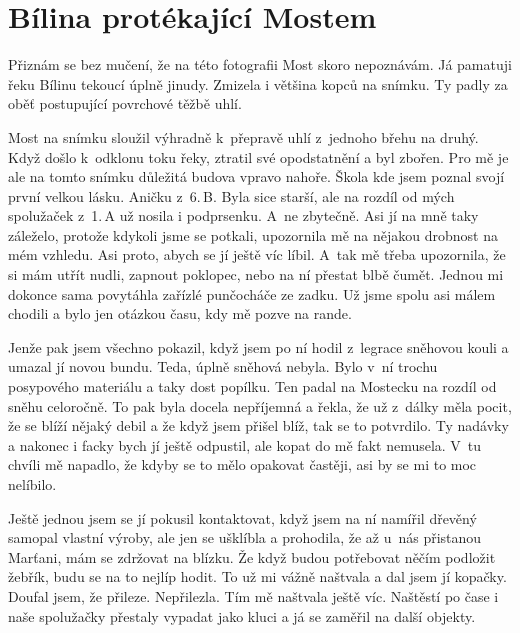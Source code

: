 
\chapter{Bílina protékající Mostem}

Přiznám se bez mučení, že na této fotografii Most skoro nepoznávám. Já pamatuji
řeku Bílinu tekoucí úplně jinudy. Zmizela i většina kopců na snímku. Ty padly
za oběť postupující povrchové těžbě uhlí.

Most na snímku sloužil výhradně k~přepravě uhlí z~jednoho břehu na druhý. Když
došlo k~odklonu toku řeky, ztratil své opodstatnění a byl zbořen. Pro mě je ale
na tomto snímku důležitá budova vpravo nahoře. Škola kde jsem poznal svojí
první velkou lásku. Aničku z~6.\,B. Byla sice starší, ale na rozdíl od mých
spolužaček z~1.\,A už nosila i podprsenku. A~ne zbytečně. Asi jí na mně taky
záleželo, protože kdykoli jsme se potkali, upozornila mě na nějakou drobnost na
mém vzhledu. Asi proto, abych se jí ještě víc líbil. A~tak mě třeba upozornila,
že si mám utřít nudli, zapnout poklopec, nebo na ní přestat blbě čumět. Jednou
mi dokonce sama povytáhla zařízlé punčocháče ze zadku. Už jsme spolu asi málem
chodili a bylo jen otázkou času, kdy mě pozve na rande.

Jenže pak jsem všechno pokazil, když jsem po ní hodil z~legrace sněhovou kouli
a umazal jí novou bundu. Teda, úplně sněhová nebyla. Bylo v~ní trochu
posypového materiálu a taky dost popílku. Ten padal na Mostecku na rozdíl od
sněhu celoročně. To pak byla docela nepříjemná a řekla, že už z~dálky měla
pocit, že se blíží nějaký debil a že když jsem přišel blíž, tak se to
potvrdilo. Ty nadávky a nakonec i facky bych jí ještě odpustil, ale kopat do mě
fakt nemusela. V~tu chvíli mě napadlo, že kdyby se to mělo opakovat častěji,
asi by se mi to moc nelíbilo.

Ještě jednou jsem se jí pokusil kontaktovat, když jsem na ní namířil dřevěný
samopal vlastní výroby, ale jen se ušklíbla a prohodila, že až u~nás přistanou
Marťani, mám se zdržovat na blízku. Že když budou potřebovat něčím podložit
žebřík, budu se na to nejlíp hodit. To už mi vážně naštvala a dal jsem jí
kopačky. Doufal jsem, že přileze. Nepřilezla. Tím mě naštvala ještě víc.
Naštěstí po čase i naše spolužačky přestaly vypadat jako kluci a já se zaměřil
na další objekty.

